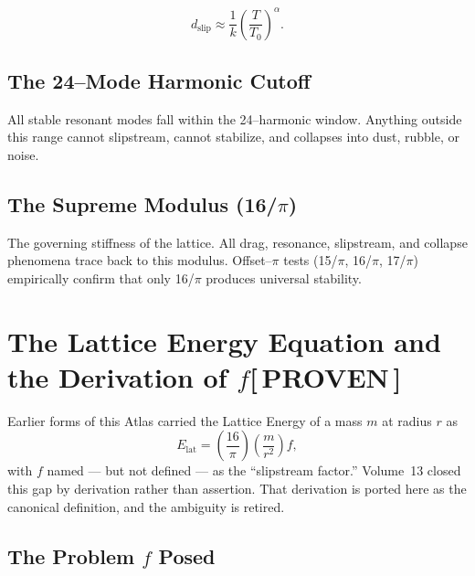 \documentclass[12pt,oneside]{book}
\newcommand{\TheoryTag}{\;\colorbox{theorytag!15}{\textcolor{theorytag}{\footnotesize\bfseries [\,THEORY / REACH\,]}}}
\newcommand{\ProvenTag}{\;\colorbox{proventag!15}{\textcolor{proventag}{\footnotesize\bfseries [\,PROVEN\,]}}}
\begin{document}
\[
d_{\text{slip}} \approx \frac{1}{k} \left(\frac{T}{T_0}\right)^\alpha.
\]



\subsection{The 24--Mode Harmonic Cutoff}
All stable resonant modes fall within the 24--harmonic window.  
Anything outside this range cannot slipstream, cannot stabilize, and collapses into dust, rubble, or noise.

\subsection{The Supreme Modulus (16/$\pi$)}
The governing stiffness of the lattice.  
All drag, resonance, slipstream, and collapse phenomena trace back to this modulus.  
Offset--$\pi$ tests (15/$\pi$, 16/$\pi$, 17/$\pi$) empirically confirm that only 16/$\pi$ produces universal stability.



\section{The Lattice Energy Equation and the Derivation of $f$\ProvenTag}

Earlier forms of this Atlas carried the Lattice Energy of a mass $m$ at radius
$r$ as
\[
E_{\text{lat}} = \left(\frac{16}{\pi}\right)\!\left(\frac{m}{r^2}\right) f,
\]
with $f$ named --- but not defined --- as the ``slipstream factor.'' Volume~13
closed this gap by derivation rather than assertion. That derivation is ported
here as the canonical definition, and the ambiguity is retired.

\subsection{The Problem $f$ Posed}
\end{document}
